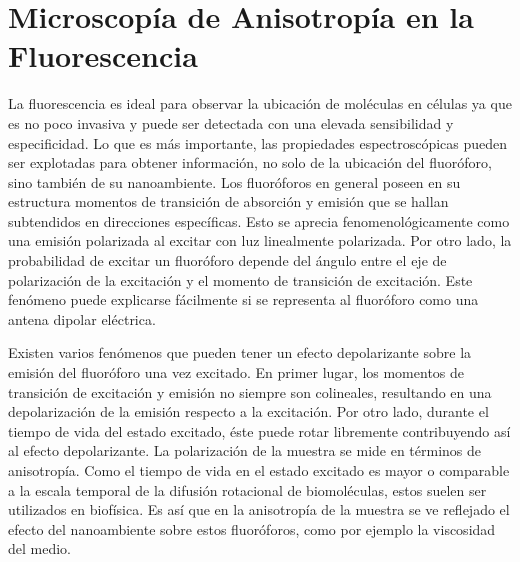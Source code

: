 \chapter{Microscopía de Anisotropía en la Fluorescencia}
\label{cap:microscopia}


La fluorescencia es ideal para observar la ubicación de moléculas en células ya que es no poco invasiva y puede ser detectada con una elevada sensibilidad y especificidad. Lo que es más importante, las propiedades espectroscópicas pueden ser explotadas para obtener información, no solo de la ubicación del fluoróforo, sino también de su nanoambiente\cite{Bastiaens1999}. Los fluoróforos en general poseen en su estructura momentos de transición de absorción y emisión que se hallan subtendidos en direcciones específicas. Esto se aprecia fenomenológicamente como una emisión polarizada al excitar con luz linealmente polarizada. Por otro lado, la probabilidad de excitar un fluoróforo depende del ángulo entre el eje de polarización de la excitación y el momento de transición de excitación. Este fenómeno puede explicarse fácilmente si se representa al fluoróforo como una antena dipolar eléctrica.

Existen varios fenómenos que pueden tener un efecto depolarizante sobre la emisión del fluoróforo una vez excitado. En primer lugar, los momentos de transición de excitación y emisión no siempre son colineales, resultando en una depolarización de la emisión respecto a la excitación. Por otro lado, durante el tiempo de vida del estado excitado, éste puede rotar libremente contribuyendo así al efecto depolarizante. La polarización de la muestra se mide en términos de anisotropía. Como el tiempo de vida en el estado excitado es mayor o comparable a la escala temporal de la difusión rotacional de biomoléculas, estos suelen ser utilizados en biofísica. Es así que en la anisotropía de la muestra se ve reflejado el efecto del nanoambiente sobre estos fluoróforos, como por ejemplo la viscosidad del medio\cite{Lakowicz2006}.


